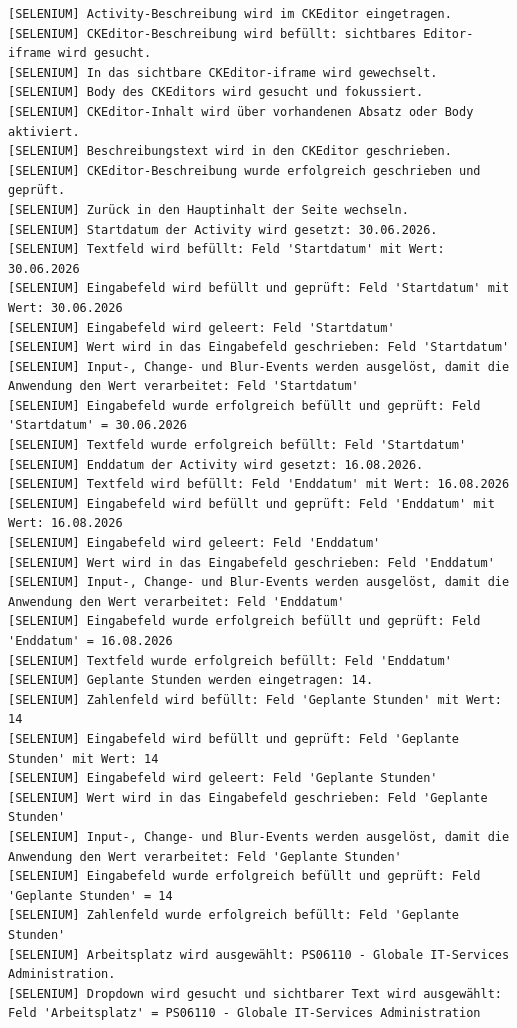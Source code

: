 \begin{lstlisting}[caption={Selenium -- Neue Activity (Erfolgreich)}, label={lst:sel_new_act_ok}, style=logStyle]
[SELENIUM] Activity-Beschreibung wird im CKEditor eingetragen.
[SELENIUM] CKEditor-Beschreibung wird befüllt: sichtbares Editor-iframe wird gesucht.
[SELENIUM] In das sichtbare CKEditor-iframe wird gewechselt.
[SELENIUM] Body des CKEditors wird gesucht und fokussiert.
[SELENIUM] CKEditor-Inhalt wird über vorhandenen Absatz oder Body aktiviert.
[SELENIUM] Beschreibungstext wird in den CKEditor geschrieben.
[SELENIUM] CKEditor-Beschreibung wurde erfolgreich geschrieben und geprüft.
[SELENIUM] Zurück in den Hauptinhalt der Seite wechseln.
[SELENIUM] Startdatum der Activity wird gesetzt: 30.06.2026.
[SELENIUM] Textfeld wird befüllt: Feld 'Startdatum' mit Wert: 30.06.2026
[SELENIUM] Eingabefeld wird befüllt und geprüft: Feld 'Startdatum' mit Wert: 30.06.2026
[SELENIUM] Eingabefeld wird geleert: Feld 'Startdatum'
[SELENIUM] Wert wird in das Eingabefeld geschrieben: Feld 'Startdatum'
[SELENIUM] Input-, Change- und Blur-Events werden ausgelöst, damit die Anwendung den Wert verarbeitet: Feld 'Startdatum'
[SELENIUM] Eingabefeld wurde erfolgreich befüllt und geprüft: Feld 'Startdatum' = 30.06.2026
[SELENIUM] Textfeld wurde erfolgreich befüllt: Feld 'Startdatum'
[SELENIUM] Enddatum der Activity wird gesetzt: 16.08.2026.
[SELENIUM] Textfeld wird befüllt: Feld 'Enddatum' mit Wert: 16.08.2026
[SELENIUM] Eingabefeld wird befüllt und geprüft: Feld 'Enddatum' mit Wert: 16.08.2026
[SELENIUM] Eingabefeld wird geleert: Feld 'Enddatum'
[SELENIUM] Wert wird in das Eingabefeld geschrieben: Feld 'Enddatum'
[SELENIUM] Input-, Change- und Blur-Events werden ausgelöst, damit die Anwendung den Wert verarbeitet: Feld 'Enddatum'
[SELENIUM] Eingabefeld wurde erfolgreich befüllt und geprüft: Feld 'Enddatum' = 16.08.2026
[SELENIUM] Textfeld wurde erfolgreich befüllt: Feld 'Enddatum'
[SELENIUM] Geplante Stunden werden eingetragen: 14.
[SELENIUM] Zahlenfeld wird befüllt: Feld 'Geplante Stunden' mit Wert: 14
[SELENIUM] Eingabefeld wird befüllt und geprüft: Feld 'Geplante Stunden' mit Wert: 14
[SELENIUM] Eingabefeld wird geleert: Feld 'Geplante Stunden'
[SELENIUM] Wert wird in das Eingabefeld geschrieben: Feld 'Geplante Stunden'
[SELENIUM] Input-, Change- und Blur-Events werden ausgelöst, damit die Anwendung den Wert verarbeitet: Feld 'Geplante Stunden'
[SELENIUM] Eingabefeld wurde erfolgreich befüllt und geprüft: Feld 'Geplante Stunden' = 14
[SELENIUM] Zahlenfeld wurde erfolgreich befüllt: Feld 'Geplante Stunden'
[SELENIUM] Arbeitsplatz wird ausgewählt: PS06110 - Globale IT-Services Administration.
[SELENIUM] Dropdown wird gesucht und sichtbarer Text wird ausgewählt: Feld 'Arbeitsplatz' = PS06110 - Globale IT-Services Administration

\end{lstlisting}
